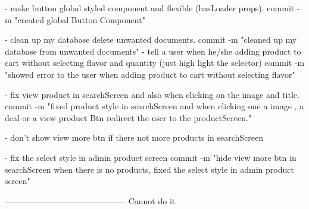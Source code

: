 -   make button global styled component and flexible 
      (hasLoader props).
      commit -m "created global Button Component"

- clean up my database delete unwanted documents.
      commit -m "cleaned up my database from unwanted documents"
-  tell a user when he/she adding product to cart without 
selecting flavor and quantity (just high light the selector)
      commit -m "showed error to the user when adding product to cart without selecting flavor"

-   fix view product in searchScreen and also when clicking on the image and title.
      commit -m "fixed product style in searchScreen and when clicking one a image , a deal or a view product Btn redirect the user to the productScreen."

-   don't show view more btn if there not more products in searchScreen

-   fix the select style in admin product screen
      commit -m "hide view more btn in searchScreen when there is no products, fixed the select style in admin product screen"

--------------------------------------------
Cannot do it
